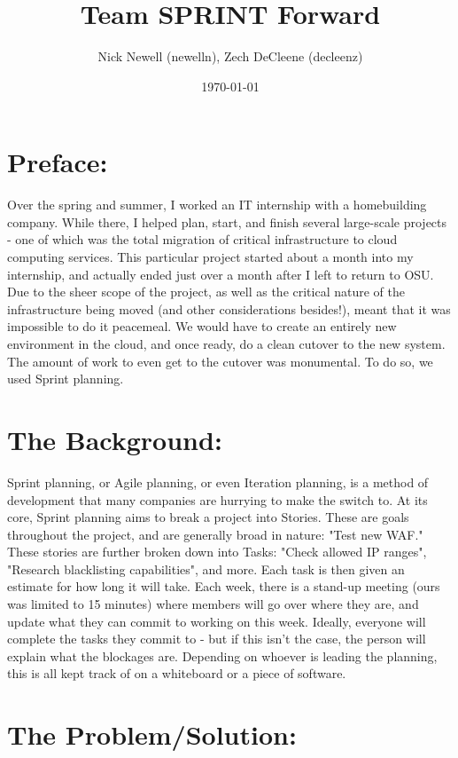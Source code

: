 \documentclass[12pt]{article}
\title{Team SPRINT Forward}
\author{Nick Newell (newelln), Zech DeCleene (decleenz)}
\date{\today}
\begin{document}
\maketitle


\section{Preface:}
 
        	 Over the spring and summer, I worked an IT internship with a homebuilding company. While there, I helped plan, start, and finish several large-scale projects - one of which was the total migration of critical infrastructure to cloud computing services. This particular project started about a month into my internship, and actually ended just over a month after I left to return to OSU. Due to the sheer scope of the project, as well as the critical nature of the infrastructure being moved (and other considerations besides!), meant that it was impossible to do it peacemeal. We would have to create an entirely new environment in the cloud, and once ready, do a clean cutover to the new system. The amount of work to even get to the cutover was monumental. To do so, we used Sprint planning.
 
 
\section{The Background:}
 
        	Sprint planning, or Agile planning, or even Iteration planning, is a method of development that many companies are hurrying to make the switch to. At its core, Sprint planning aims to break a project into Stories. These are goals throughout the project, and are generally broad in nature: "Test new WAF." These stories are further broken down into Tasks: "Check allowed IP ranges", "Research blacklisting capabilities", and more. Each task is then given an estimate for how long it will take. Each week, there is a stand-up meeting (ours was limited to 15 minutes) where members will go over where they are, and update what they can commit to working on this week. Ideally, everyone will complete the tasks they commit to - but if this isn't the case, the person will explain what the blockages are. Depending on whoever is leading the planning, this is all kept track of on a whiteboard or a piece of software.

        	
 
 
 
\section{The Problem/Solution:}
 
\end{document}
